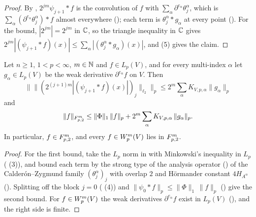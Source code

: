 \begin{proof}
\leanok
By , $2^{jm} \psi_{j+1} * f$ is the convolution of $f$ with
$\sum_\alpha \partial^{e_\alpha} \theta^\alpha_j$, which is
$\sum_\alpha (\partial^{e_\alpha} \theta^\alpha_j) * f$ almost everywhere
(); each term is $\theta^\alpha_j * g_\alpha$ at every point
(). For the bound, $|2^{jm}| = 2^{jm}$ in $\mathbb{C}$, so the
triangle inequality in $\mathbb{C}$ gives
$2^{jm} |(\psi_{j+1} * f)(x)| \leq \sum_\alpha |(\theta^\alpha_j * g_\alpha)(x)|$, and
 (5) gives the claim.
\end{proof}

\begin{theorem}
\label{thm:sobolev-to-triebel-lizorkin}
\leanok
{}
Let $n \geq 1$, $1 < p < \infty$, $m \in \mathbb{N}$ and $f \in L_p(V)$, and for every multi-index
$\alpha$ let $g_\alpha \in L_p(V)$ be the weak derivative $\partial^{e_\alpha} f$ on $V$. Then
\[
  \bigl\| \|(2^{(j+1)m} |(\psi_{j+1} * f)(x)|)_j\|_{\ell_2} \bigr\|_p
  \leq 2^m \sum_\alpha K_{V,p,\alpha} \|g_\alpha\|_p
\]
and
\[
  \|f\|_{F^{m}_{p,2}} \leq \|\Phi\|_1 \, \|f\|_p + 2^m \sum_\alpha K_{V,p,\alpha} \,
  \|g_\alpha\|_p .
\]
In particular, $f \in F^{m}_{p,2}$, and every $f \in W^{m}_{p}(V)$ lies in $F^{m}_{p,2}$.
\end{theorem}

\begin{proof}
\leanok
For the first bound, take the $L_p$ norm in  with
Minkowski's inequality in $L_p$ ( (3)), and bound each term by the
strong type of the analysis operator () of the
Calder\'on--Zygmund family $(\theta^\alpha_j)_j$ with overlap $2$ and H\"ormander constant
$4 H_{A^\alpha}$ (). Splitting off the block $j = 0$
( (4)) and $\|\psi_0 * f\|_p \leq \|\Phi\|_1 \, \|f\|_p$
() give the second bound.
For $f \in W^{m}_{p}(V)$ the weak derivatives $\partial^{e_\alpha} f$ exist in $L_p(V)$
(), and the right side is finite.
\end{proof}

